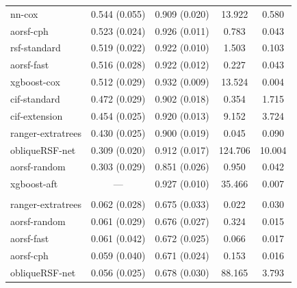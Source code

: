 \documentclass[12pt]{article}\usepackage[]{graphicx}\usepackage[]{xcolor}
\newenvironment{knitrout}{}{} %
\begin{document}
\begin{knitrout}
\begin{longtable}[t]{lcccc}
\hspace{1em}nn-cox & 0.544 (0.055) & 0.909 (0.020) & 13.922 & 0.580\\
\hspace{1em}aorsf-cph & 0.523 (0.024) & 0.926 (0.011) & 0.783 & 0.043\\
\hspace{1em}rsf-standard & 0.519 (0.022) & 0.922 (0.010) & 1.503 & 0.103\\
\hspace{1em}aorsf-fast & 0.516 (0.028) & 0.922 (0.012) & 0.227 & 0.043\\
\hspace{1em}xgboost-cox & 0.512 (0.029) & 0.932 (0.009) & 13.524 & 0.004\\
\hspace{1em}cif-standard & 0.472 (0.029) & 0.902 (0.018) & 0.354 & 1.715\\
\hspace{1em}cif-extension & 0.454 (0.025) & 0.920 (0.013) & 9.152 & 3.724\\
\hspace{1em}ranger-extratrees & 0.430 (0.025) & 0.900 (0.019) & 0.045 & 0.090\\
\hspace{1em}obliqueRSF-net & 0.309 (0.020) & 0.912 (0.017) & 124.706 & 10.004\\
\hspace{1em}aorsf-random & 0.303 (0.029) & 0.851 (0.026) & 0.950 & 0.042\\
\hspace{1em}xgboost-aft & --- & 0.927 (0.010) & 35.466 & 0.007\\
\addlinespace[0.3em]
\multicolumn{5}{l}{\textit{\textbf{NCCTG Lung Cancer; death, n = 228, p = 9}}}\\
\hline
\hspace{1em}ranger-extratrees & 0.062 (0.028) & 0.675 (0.033) & 0.022 & 0.030\\
\hspace{1em}aorsf-random & 0.061 (0.029) & 0.676 (0.027) & 0.324 & 0.015\\
\hspace{1em}aorsf-fast & 0.061 (0.042) & 0.672 (0.025) & 0.066 & 0.017\\
\hspace{1em}aorsf-cph & 0.059 (0.040) & 0.671 (0.024) & 0.153 & 0.016\\
\hspace{1em}obliqueRSF-net & 0.056 (0.025) & 0.678 (0.030) & 88.165 & 3.793\\

\end{longtable}
\end{knitrout}
\end{document}
